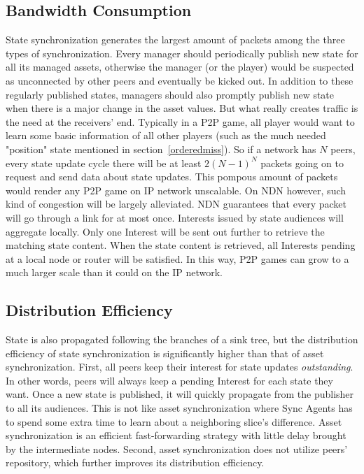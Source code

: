 \subsection{Bandwidth Consumption}
State synchronization generates the largest amount of packets among the three types of synchronization. Every manager should periodically publish new state for all its managed assets, otherwise the manager (or the player) would be suspected as unconnected by other peers and eventually be kicked out. In addition to these regularly published states, managers should also promptly publish new state when there is a major change in the asset values. But what really creates traffic is the need at the receivers' end. Typically in a P2P game, all player would want to learn some basic information of all other players (such as the much needed "{position}" state mentioned in section~\ref{orderedmiss}). So if a network has $N$ peers, every state update cycle there will be at least $2(N-1)^N$ packets going on to request and send data about state updates. This pompous amount of packets would render any P2P game on IP network unscalable. On NDN however, such kind of congestion will be largely alleviated. NDN guarantees that every packet will go through a link for at most once. Interests issued by state audiences will aggregate locally. Only one Interest will be sent out further to retrieve the matching state content. When the state content is retrieved, all Interests pending at a local node or router will be satisfied. In this way, P2P games can grow to a much larger scale than it could on the IP network.

\subsection{Distribution Efficiency}

State is also propagated following the branches of a sink tree, but the distribution efficiency of state synchronization is significantly higher than that of asset synchronization. First, all peers keep their interest for state updates \emph{outstanding}. In other words, peers will always keep a pending Interest for each state they want. Once a new state is published, it will quickly propagate from the publisher to all its audiences. This is not like asset synchronization where Sync Agents has to spend some extra time to learn about a neighboring slice's difference. Asset synchronization is an efficient fast-forwarding strategy with little delay brought by the intermediate nodes. Second, asset synchronization does not utilize peers' repository, which further improves its distribution efficiency.

